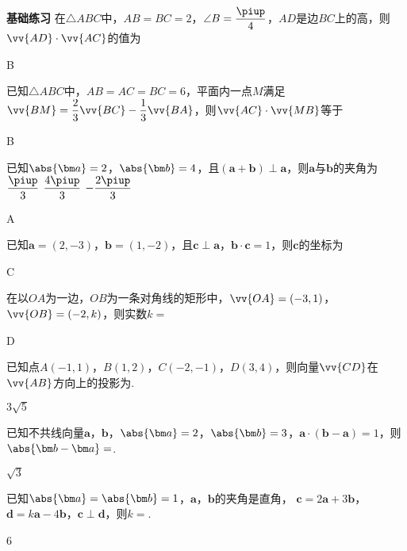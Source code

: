 \begin{Theorem}[平面向量基本定理]
\begin{exercise}{{\textbf{基础练习}}}
      在$\triangle{ABC}$中，$AB=BC=2$，$\angle{B}=\dfrac{\piup}4$，$AD$是边$BC$上的高，则$\vv{AD}\cdot\vv{AC}$的值为\xz
      \begin{answer}
        B
      \end{answer}
    \item%
      已知$\triangle{ABC}$中，$AB=AC=BC=6$，平面内一点$M$满足$\vv{BM}=\dfrac{2}3\vv{BC}-\dfrac{1}3\vv{BA}$，则$\vv{AC}\cdot\vv{MB}$等于\xz
      \begin{answer}
        B
      \end{answer}
    \item%
      已知$\abs{\bm a}=2$，$\abs{\bm b}=4$，且$(\bm a+\bm b)\perp \bm a$，则$\bm a$与$\bm b$的夹角为\xz
       {$\dfrac{\piup}3$}
       {$\dfrac{4\piup}3$}
       {$-\dfrac{2\piup}3$}
      \begin{answer}
        A
      \end{answer}
    \item%
      已知$\bm a=(2,-3)$，$\bm b=(1,-2)$，且$\bm c\perp \bm a$，$\bm b\cdot\bm c=1$，则$\bm c$的坐标为\xz
      \begin{answer}
        C
      \end{answer}
    \item%
      在以$OA$为一边，$OB$为一条对角线的矩形中，$\vv{OA}=(-3,1)$，$\vv{OB}=(-2,k)$，则实数$k=$\xz
      \begin{answer}
        D
      \end{answer}
    \item%
      已知点$A(-1,1)$，$B(1,2)$，$C(-2,-1)$，$D(3,4)$，则向量$\vv{CD}$在$\vv{AB}$方向上的投影为\tk.
      \begin{answer}
        $3\sqrt{5}$
      \end{answer}
    \item%
      已知不共线向量$\bm a$，$\bm b$，$\abs{\bm a}=2$，$\abs{\bm b}=3$，$\bm a\cdot(\bm b-\bm a)=1$，则$\abs{\bm b-\bm a}=$\tk.
      \begin{answer}
        $\sqrt{3}$
      \end{answer}
    \item%
      已知$\abs{\bm a}=\abs{\bm b}=1$，$\bm a$，$\bm b$的夹角是直角，
      $\bm c=2\bm a+3\bm b$，$\bm d=k\bm a-4\bm b$，$\bm c\perp\bm d$，则$k=$\tk.
      \begin{answer}
        6
      \end{answer}
  \end{exercise}
\newpage

\end{Theorem}
